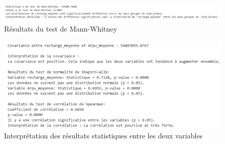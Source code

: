 \begin{figure}[H]
    \centering
    \includegraphics[width=0.8\linewidth]{capture_sas_43.png}
    \caption{Résultats du test de Mann-Whitney}
    \label{AnB5}
\end{figure}



\begin{figure}[H]
    \centering
    \includegraphics[width=0.8\linewidth]{capture_sas_49.png}
    \caption{Interprétation des résultats statistiques entre les deux variables}
    \label{11}
\end{figure}
